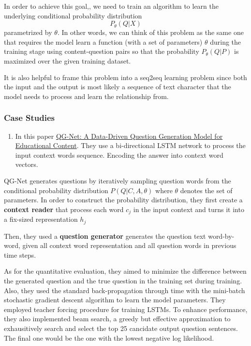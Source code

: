 \documentclass[]{book}
\providecommand{\tightlist}{%
  \setlength{\itemsep}{0pt}\setlength{\parskip}{0pt}}
\theoremstyle{definition}
\theoremstyle{definition}
\theoremstyle{definition}
\theoremstyle{remark}
\begin{document}
In order to achieve this goal,, we need to train an algorithm to learn
the underlying conditional probability distribution \[P_{\theta}(Q|X)\]
parametrized by \(\theta\). In other words, we can think of this problem
as the same one that requires the model learn a function (with a set of
parameters) \(\theta\) during the training stage using content-question
pairs so that the probability \(P_{\theta}(Q|P)\) is maximized over the
given training dataset.

It is also helpful to frame this problem into a seq2seq learning problem
since both the input and the output is most likely a sequence of text
character that the model needs to process and learn the relationship
from.

\subsubsection{Case Studies}\label{case-studies}

\begin{enumerate}
\def\labelenumi{\arabic{enumi}.}
\tightlist
\item
  In this paper
  \href{http://www.princeton.edu/~shitingl/papers/18l@s-qgen.pdf}{QG-Net:
  A Data-Driven Question Generation Model for Educational Content}. They
  use a bi-directional LSTM network to process the input context words
  sequence. Encoding the answer into context word vectors.
\end{enumerate}

QG-Net generates questions by iteratively sampling question words from
the conditional probability distribution \(P(Q|C,A,\theta)\) where
\(\theta\) denotes the set of parameters. In order to construct the
probability distribution, they first create a \textbf{context reader}
that process each word \(c_j\) in the input context and turns it into a
fix-sized representation \(h_j\)

Then, they used a \textbf{question generator} generates the question
text word-by-word, given all context word representation and all
question words in previous time steps.

As for the quantitative evaluation, they aimed to minimize the
difference between the generated question and the true question in the
training set during training. Also, they used the standard
back-propagation through time with the mini-batch stochastic gradient
descent algorithm to learn the model parameters. They employed teacher
forcing procedure for training LSTMs. To enhance performance, they also
implemented beam search, a greedy but effective approximation to
exhausitively search and select the top 25 cancidate output question
sentences. The final one would be the one with the lowest negative log
likelihood.
\end{document}
